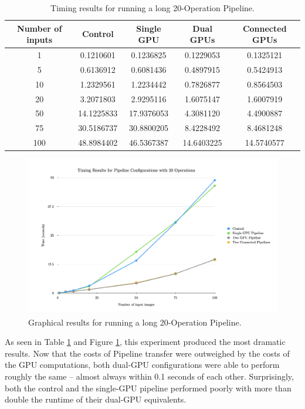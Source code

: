 \begin{table}[H]
\centering
\begin{tabular}{ |c|c|c|c|c| } 
\hline
Number of inputs & Control & Single GPU & Dual GPUs & Connected GPUs \\
\hline
1&	0.1210601&	0.1236825&	0.1229053&	0.1325121\\
5&	0.6136912&	0.6081436&	0.4897915&	0.5424913\\
10&	1.2329561&	1.2234442&	0.7826877&	0.8564503\\
20&	3.2071803&	2.9295116&	1.6075147&	1.6007919\\
50&	14.1225833&	17.9376053&	4.3081120&	4.4900887\\
75&	30.5186737&	30.8800205&	8.4228492&	8.4681248\\
100&	48.8984402&	46.5367387&	14.6403225&	14.5740577\\
\hline
\end{tabular}
\caption{Timing results for running a long 20-Operation Pipeline.}
\label{pipelineTable3}
\end{table}

\begin{figure}[H]
\includegraphics[width=\textwidth]{figures/pipelineChart2.png}
\centering
\caption{Graphical results for running a long 20-Operation Pipeline.}
\label{pipelineChart3}
\end{figure}

\quad As seen in Table \ref{pipelineTable3} and Figure \ref{pipelineChart3}, this experiment produced the most dramatic results. Now that the costs of Pipeline transfer were outweighed by the costs of the GPU computations, both dual-GPU configurations were able to perform roughly the same -- almost always within 0.1 seconds of each other. Surprisingly, both the control and the single-GPU pipeline performed poorly with more than double the runtime of their dual-GPU equivalents. 
